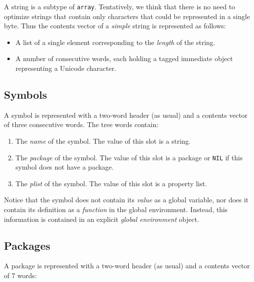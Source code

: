 A string is a subtype of \texttt{array}.  Tentatively, we think that
there is no need to optimize strings that contain only characters that
could be represented in a single byte.  Thus the contents vector of a
\emph{simple} string is represented as follows:

\begin{itemize}
\item A list of a single element corresponding to the \emph{length} of
  the string. 
\item A number of consecutive words, each holding a tagged immediate
  object representing a Unicode character.
\end{itemize}

\subsection{Symbols}

A symbol is represented with a two-word header (as usual) and a
contents vector of three consecutive words.  The tree words contain:

\begin{enumerate}
\item The \emph{name} of the symbol.  The value of this slot is a
  string.
\item The \emph{package} of the symbol.  The value of this slot is a
  package or \texttt{NIL} if this symbol does not have a package.
\item The \emph{plist} of the symbol.  The value of this slot is a
  property list.
\end{enumerate}

Notice that the symbol does not contain its \emph{value} as a global
variable, nor does it contain its definition as a \emph{function} in
the global environment.  Instead, this information is contained in an
explicit \emph{global environment} object.

\subsection{Packages}

A package is represented with a two-word header (as usual) and a
contents vector of 7 words:

